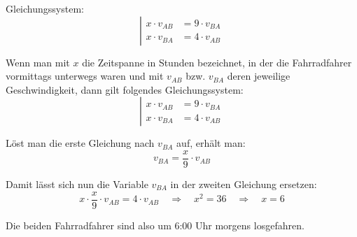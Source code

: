 \begin{exercise}
    Gleichungssystem:
    \begin{equation*}
      \left|
      \begin{split}
        x\cdot v_{AB}&=9\cdot v_{BA}\\
        x\cdot v_{BA}&=4\cdot v_{AB}
      \end{split}
      \right.
    \end{equation*}
  \fi
  \ifoutcome\outcome\par
    Wenn man mit $x$ die Zeitspanne in Stunden bezeichnet, in der die
    Fahrradfahrer vormittags unterwegs waren und mit $v_{AB}$ bzw.
    $v_{BA}$ deren jeweilige Geschwindigkeit, dann gilt folgendes
    Gleichungssystem:
    \begin{equation*}
      \left|
      \begin{split}
        x\cdot v_{AB}&=9\cdot v_{BA}\\
        x\cdot v_{BA}&=4\cdot v_{AB}
      \end{split}
      \right.
    \end{equation*}\par
    Löst man die erste Gleichung nach $v_{BA}$ auf, erhält man:
    \begin{equation*}
      v_{BA}=\frac{x}{9}\cdot v_{AB}
    \end{equation*}\par
    Damit lässt sich nun die Variable $v_{BA}$ in der zweiten
    Gleichung ersetzen:
    \begin{equation*}
      x\cdot\frac{x}{9}\cdot v_{AB}=4\cdot v_{AB}
      \quad\Rightarrow\quad
      x^2=36
      \quad\Rightarrow\quad
      x=6
    \end{equation*}\par
    Die beiden Fahrradfahrer sind also um 6:00 Uhr morgens losgefahren.
  \fi
\end{exercise}
